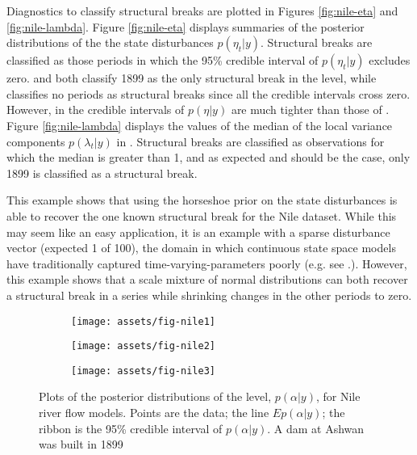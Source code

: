 \documentclass{article}
\begin{document}
Diagnostics to classify structural breaks are plotted in Figures \ref{fig:nile-eta} and \ref{fig:nile-lambda}.
Figure \ref{fig:nile-eta} displays summaries of the posterior distributions of the the state disturbances $p(\eta_{t} | y)$.
Structural breaks are classified as those periods in which the 95\% credible interval of $p(\eta_{t} | y)$ excludes zero.
 and  both classify 1899 as the only structural break in the level, while  classifies no periods as structural breaks since all the credible intervals cross zero.
However, in  the credible intervals of $p(\eta|y)$ are much tighter than those of .
Figure \ref{fig:nile-lambda} displays the values of the median of the local variance components $p(\lambda_{t} | y)$ in .
Structural breaks are classified as observations for which the median is greater than 1, and as expected and should be the case, only 1899 is classified as a structural break.

This example shows that using the horseshoe prior on the state disturbances is able to recover the one known structural break for the Nile dataset.
While this may seem like an easy application, it is an example with a sparse disturbance vector (expected 1 of 100), the domain in which continuous state space models have traditionally captured time-varying-parameters poorly (e.g. see .).
However, this example shows that a scale mixture of normal distributions can both recover a structural break in a series while shrinking changes in the other periods to zero.

\begin{figure}[htpb]
  \centering
  \begin{subfigure}{1.0\textwidth}
    \texttt{[image: assets/fig-nile1]}
    \caption{}
    \label{fig:nile-posterior-1}    
  \end{subfigure}
  \begin{subfigure}{1.0\textwidth}
    \texttt{[image: assets/fig-nile2]}
    \caption{}
    \label{fig:nile-posterior-2}
  \end{subfigure}
  \begin{subfigure}{1.0\textwidth}
    \texttt{[image: assets/fig-nile3]}
    \caption{}
    \label{fig:nile-posterior-3}
  \end{subfigure}
  \caption{Plots of the posterior distributions of the level, $p(\alpha | y)$, for Nile river flow models. Points are the data; the line $E p(\alpha | y)$; the ribbon is the 95\% credible interval of $p(\alpha | y)$. A dam at Ashwan was built in 1899}
  \label{fig:nile-posterior}
\end{figure}
\end{document}
